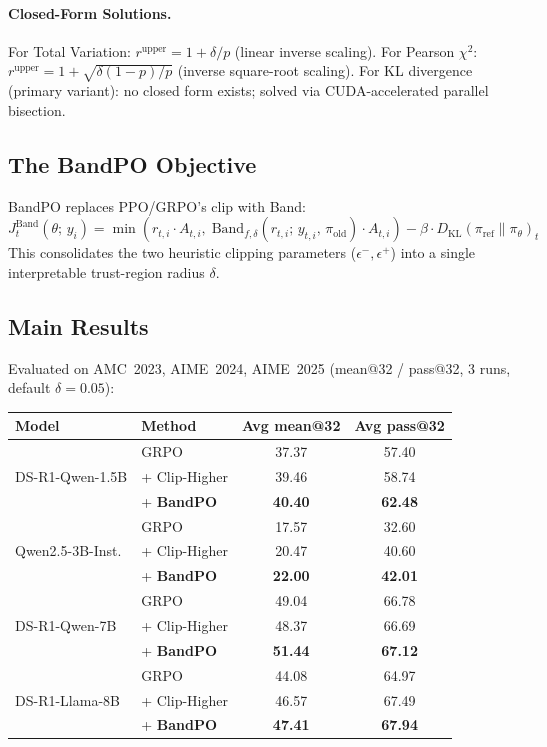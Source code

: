 \documentclass[11pt]{article}
\begin{document}
\paragraph{Closed-Form Solutions.} For Total Variation: $r^{\text{upper}} = 1 + \delta/p$ (linear inverse scaling). For Pearson $\chi^2$: $r^{\text{upper}} = 1 + \sqrt{\delta(1{-}p)/p}$ (inverse square-root scaling). For KL divergence (primary variant): no closed form exists; solved via CUDA-accelerated parallel bisection.

\subsection{The BandPO Objective}

BandPO replaces PPO/GRPO's clip with Band:
\begin{equation}
    J^{\text{Band}}_t(\theta;\, y_i) = \min\!\left(r_{t,i} \cdot A_{t,i},\; \text{Band}_{f,\delta}(r_{t,i};\, y_{t,i},\, \pi_{\text{old}}) \cdot A_{t,i}\right) - \beta \cdot D_{\text{KL}}(\pi_{\text{ref}} \| \pi_\theta)_t
\end{equation}
This consolidates the two heuristic clipping parameters ($\epsilon^-, \epsilon^+$) into a single interpretable trust-region radius $\delta$.

\subsection{Main Results}

Evaluated on AMC~2023, AIME~2024, AIME~2025 (mean@32 / pass@32, 3 runs, default $\delta{=}0.05$):

\begin{table}[h]
\centering
\small
\begin{tabular}{llcc}
\toprule
\textbf{Model} & \textbf{Method} & \textbf{Avg mean@32} & \textbf{Avg pass@32} \\
\midrule
\multirow{3}{*}{DS-R1-Qwen-1.5B} & GRPO & 37.37 & 57.40 \\
& + Clip-Higher & 39.46 & 58.74 \\
& + \textbf{BandPO} & \textbf{40.40} & \textbf{62.48} \\
\midrule
\multirow{3}{*}{Qwen2.5-3B-Inst.} & GRPO & 17.57 & 32.60 \\
& + Clip-Higher & 20.47 & 40.60 \\
& + \textbf{BandPO} & \textbf{22.00} & \textbf{42.01} \\
\midrule
\multirow{3}{*}{DS-R1-Qwen-7B} & GRPO & 49.04 & 66.78 \\
& + Clip-Higher & 48.37 & 66.69 \\
& + \textbf{BandPO} & \textbf{51.44} & \textbf{67.12} \\
\midrule
\multirow{3}{*}{DS-R1-Llama-8B} & GRPO & 44.08 & 64.97 \\
& + Clip-Higher & 46.57 & 67.49 \\
& + \textbf{BandPO} & \textbf{47.41} & \textbf{67.94} \\
\bottomrule
\end{tabular}
\end{table}
\end{document}

